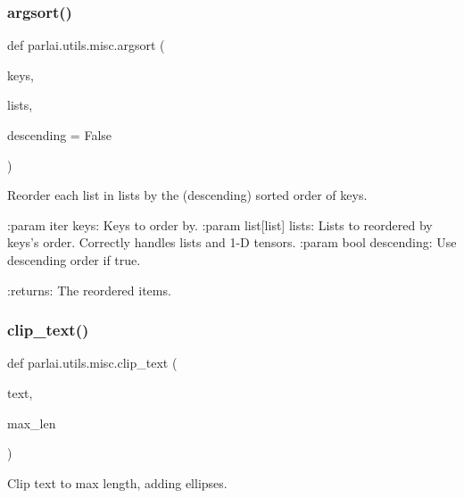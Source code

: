 \subsubsection{\texorpdfstring{argsort()}{argsort()}}
{\footnotesize\ttfamily def parlai.\+utils.\+misc.\+argsort (\begin{DoxyParamCaption}\item[{}]{keys,  }\item[{}]{lists,  }\item[{}]{descending = {\ttfamily False} }\end{DoxyParamCaption})}

\begin{DoxyVerb}Reorder each list in lists by the (descending) sorted order of keys.

:param iter keys:
    Keys to order by.
:param list[list] lists:
    Lists to reordered by keys's order.  Correctly handles lists and 1-D
    tensors.
:param bool descending:
    Use descending order if true.

:returns:
    The reordered items.
\end{DoxyVerb}
 \mbox{\label{namespaceparlai_1_1utils_1_1misc_a219b248f4399036a381ca859aa97433e}} 
\subsubsection{\texorpdfstring{clip\+\_\+text()}{clip\_text()}}
{\footnotesize\ttfamily def parlai.\+utils.\+misc.\+clip\+\_\+text (\begin{DoxyParamCaption}\item[{}]{text,  }\item[{}]{max\+\_\+len }\end{DoxyParamCaption})}

\begin{DoxyVerb}Clip text to max length, adding ellipses.
\end{DoxyVerb}
 \mbox{\label{namespaceparlai_1_1utils_1_1misc_a146f303a4c4b34993458968c74b55d2f}} 
